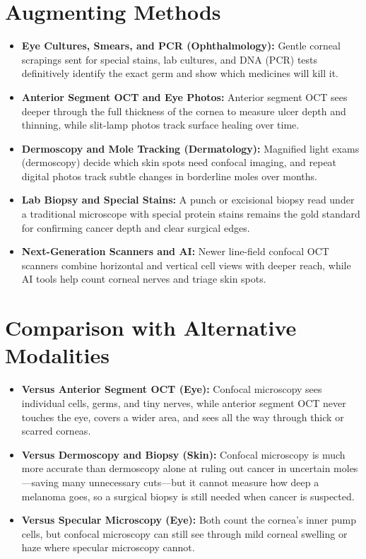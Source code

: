 \section{Augmenting Methods}
\begin{itemize}
    \item \textbf{Eye Cultures, Smears, and PCR (Ophthalmology):} Gentle corneal scrapings sent for special stains, lab cultures, and DNA (PCR) tests definitively identify the exact germ and show which medicines will kill it.
    \item \textbf{Anterior Segment OCT and Eye Photos:} Anterior segment OCT sees deeper through the full thickness of the cornea to measure ulcer depth and thinning, while slit-lamp photos track surface healing over time.
    \item \textbf{Dermoscopy and Mole Tracking (Dermatology):} Magnified light exams (dermoscopy) decide which skin spots need confocal imaging, and repeat digital photos track subtle changes in borderline moles over months.
    \item \textbf{Lab Biopsy and Special Stains:} A punch or excisional biopsy read under a traditional microscope with special protein stains remains the gold standard for confirming cancer depth and clear surgical edges.
    \item \textbf{Next-Generation Scanners and AI:} Newer line-field confocal OCT scanners combine horizontal and vertical cell views with deeper reach, while AI tools help count corneal nerves and triage skin spots.
\end{itemize}

\section{Comparison with Alternative Modalities}
\begin{itemize}
    \item \textbf{Versus Anterior Segment OCT (Eye):} Confocal microscopy sees individual cells, germs, and tiny nerves, while anterior segment OCT never touches the eye, covers a wider area, and sees all the way through thick or scarred corneas.
    \item \textbf{Versus Dermoscopy and Biopsy (Skin):} Confocal microscopy is much more accurate than dermoscopy alone at ruling out cancer in uncertain moles---saving many unnecessary cuts---but it cannot measure how deep a melanoma goes, so a surgical biopsy is still needed when cancer is suspected.
    \item \textbf{Versus Specular Microscopy (Eye):} Both count the cornea's inner pump cells, but confocal microscopy can still see through mild corneal swelling or haze where specular microscopy cannot.
\end{itemize}

